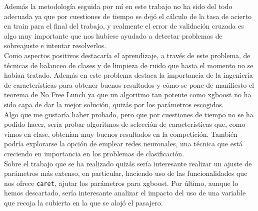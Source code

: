 \documentclass[10pt,a4paper]{article}
\newcommand{\code}[1]{\textcolor{rblue}{\texttt{#1}}} %
\begin{document}
Además la metodología seguida por mí en este trabajo no ha sido del todo adecuada ya que por cuestiones de tiempo se dejó el cálculo de la tasa de acierto en train para el final del trabajo, y realmente el error de validación cruzada es algo muy importante que nos hubiese ayudado a detectar problemas de sobreajuste e intentar resolverlos.\\

Como aspectos positivos destacaría el aprendizaje, a través de este problema, de técnicas de balanceo de clases y de limpieza de ruido que hasta el momento no se habían tratado. Además en este problema destaca la importancia de la ingeniería de características para obtener buenos resultados y cómo se pone de manifiesto el teorema de No Free Lunch ya que un algoritmo tan potente como xgboost no ha sido capa de dar la mejor solución, quizás por los parámetros escogidos.\\

Algo que me gustaría haber probado, pero que por cuestiones de tiempo no se ha podido hacer, sería probar algoritmos de selección de características que, como vimos en clase, obtenían muy buenos resultados en la competición. También podría explorarse la opción de emplear redes neuronales, una técnica que está creciendo en importancia en los problemas de clasificación.\\

Sobre el trabajo que se ha realizado quizás sería interesante realizar un ajuste de parámetros más extenso, en particular, haciendo uso de las funcionalidades que nos ofrece \code{caret}, ajutar los parámetros para xgboost. Por último, aunque lo hemos descartado, sería interesante analizar el impacto del uso de una variable que recoja la cubierta en la que se alojó el pasajero. 
\end{document}
